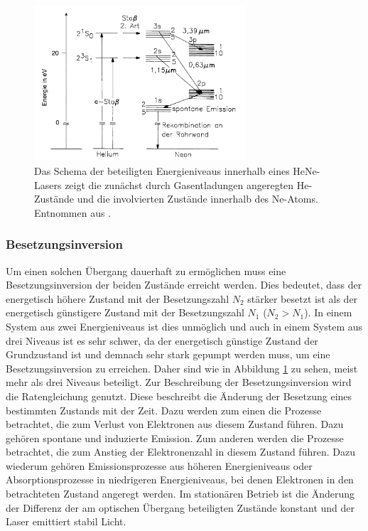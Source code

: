             \begin{figure}[h]
                \centering
                \includegraphics[width = 0.7\textwidth]{pictures/Termschema.png}
                \caption{Das Schema der beteiligten Energieniveaus innerhalb eines HeNe-Lasers zeigt die zunächst durch Gasentladungen angeregten He-Zustände und die involvierten Zustände innerhalb des Ne-Atoms. Entnommen aus \cite{eichler_laser_2015}.}
                \label{fig:termschema}
            \end{figure}

            \FloatBarrier
            

        \subsubsection{Besetzungsinversion}
            Um einen solchen Übergang dauerhaft zu ermöglichen muss eine Besetzungsinversion der beiden Zustände erreicht werden. Dies bedeutet, dass der energetisch höhere Zustand mit der Besetzungszahl $N_2$ 
            stärker besetzt ist als der energetisch günstigere Zustand mit der Besetzungszahl $N_1$ ($N_2 > N_1$). In einem System aus zwei Energieniveaus ist dies unmöglich und auch in einem System aus drei 
            Niveaus ist es sehr schwer, da der energetisch günstige Zustand der Grundzustand ist und demnach sehr stark gepumpt werden muss, um eine Besetzungsinversion zu erreichen. Daher sind wie in Abbildung 
            \ref{fig:termschema} zu sehen, meist mehr als drei Niveaus beteiligt. Zur Beschreibung der Besetzungsinversion wird die Ratengleichung genutzt. Diese beschreibt die Änderung der Besetzung eines 
            bestimmten Zustands mit der Zeit. Dazu werden zum einen die Prozesse betrachtet, die zum Verlust von Elektronen aus diesem Zustand führen. Dazu gehören spontane und induzierte Emission. Zum anderen werden 
            die Prozesse betrachtet, die zum Anstieg der Elektronenzahl in diesem Zustand führen. Dazu wiederum gehören Emissionsprozesse aus höheren Energieniveaus oder Absorptionsprozesse in niedrigeren 
            Energieniveaus, bei denen Elektronen in den betrachteten Zustand angeregt werden. Im stationären Betrieb ist die Änderung der Differenz der am optischen Übergang beteiligten Zustände konstant und 
            der Laser emittiert stabil Licht.      


